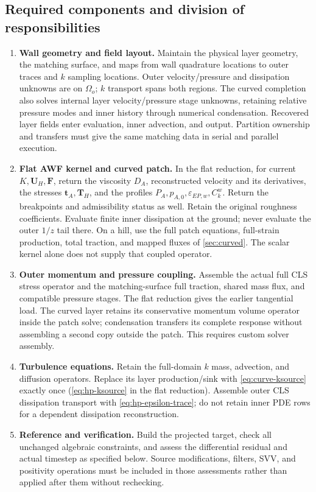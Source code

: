 \documentclass[11pt,a4paper]{article}
\numberwithin{equation}{section}
\newcommand{\eps}{\varepsilon}
\newcommand{\EEP}{\eps_{EP,w}}
\begin{document}
\subsection{Required components and division of responsibilities}
\begin{enumerate}
\item \textbf{Wall geometry and field layout.} Maintain the physical
layer geometry, the matching surface, and maps from wall quadrature
locations to outer traces and $k$ sampling locations. Outer velocity/pressure and dissipation unknowns are on $\Omega_o$;
$k$ transport spans both regions. The curved completion also solves
internal layer velocity/pressure stage unknowns, retaining relative
pressure modes and inner history through numerical condensation.
Recovered layer fields enter evaluation, inner advection, and output.
Partition ownership and transfers must give the same matching data in
serial and parallel execution.
\item \textbf{Flat AWF kernel and curved patch.} In the flat reduction,
for current $K,\bm U_H,\bm F$, return
the viscosity $D_A$, reconstructed velocity and its derivatives,
the stresses $\bm t_A,\bm T_H$, and the profiles
$P_A,p_{A,0},\EEP,C_k^w$. Return the breakpoints and admissibility
status as well. Retain the
original roughness coefficients. Evaluate finite inner dissipation at
the ground; never evaluate the outer $1/z$ tail there. On a hill,
use the full patch equations, full-strain production, total traction,
and mapped fluxes of \cref{sec:curved}. The scalar kernel alone
does not supply that coupled operator.
\item \textbf{Outer momentum and pressure coupling.} Assemble the
actual full CLS stress operator and the matching-surface full
traction, shared mass flux, and compatible pressure stages. The flat
reduction gives the earlier tangential load. The curved layer retains
its conservative momentum volume operator inside the patch solve;
condensation transfers its complete response without assembling a
second copy outside the patch. This requires custom solver assembly.
\item \textbf{Turbulence equations.} Retain the full-domain $k$ mass,
advection, and diffusion operators. Replace its layer production/sink
with \cref{eq:curve-ksource} exactly once (\cref{eq:hp-ksource}
in the flat reduction). Assemble outer CLS dissipation
transport with \cref{eq:hp-epsilon-trace}; do not retain inner PDE rows
for a dependent dissipation reconstruction.
\item \textbf{Reference and verification.} Build the projected target,
check all unchanged algebraic constraints, and assess the differential
residual and actual timestep as specified below. Source modifications,
filters, SVV, and positivity operations must be included in those
assessments rather than applied after them without rechecking.
\end{enumerate}
\end{document}

